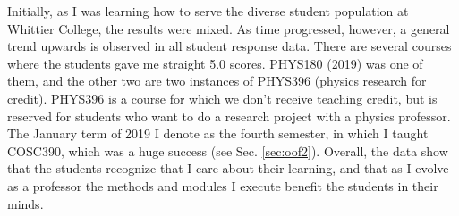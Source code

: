 \documentclass[../../main.tex]{subfiles}
\begin{document}
Initially, as I was learning how to serve the diverse student population at Whittier College, the results were mixed.  As time progressed, however, a general trend upwards is observed in all student response data.  There are several courses where the students gave me straight 5.0 scores.  PHYS180 (2019) was one of them, and the other two are two instances of PHYS396 (physics research for credit).  PHYS396 is a course for which we don't receive teaching credit, but is reserved for students who want to do a research project with a physics professor.  The January term of 2019 I denote as the fourth semester, in which I taught COSC390, which was a huge success (see Sec. \ref{sec:oof2}).  Overall, the data show that the students recognize that I care about their learning, and that as I evolve as a professor the methods and modules I execute benefit the students in their minds.  \\ \hspace{0.1cm}
\end{document}
